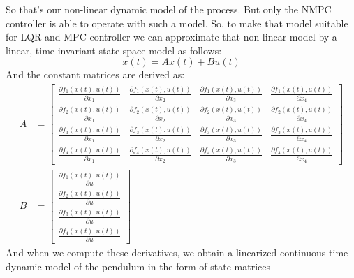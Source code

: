 So that’s our non-linear dynamic model of the process. But only the NMPC controller is able to operate with such a model. So, to make that model suitable for LQR and MPC controller we can approximate that non-linear model by a linear, time-invariant state-space model as follows:
\begin{equation}\dot{x}(t) = Ax(t) + Bu(t)\end{equation}
And the constant matrices are derived as:
\begin{subequations}
	\begin{align}
	A &= \begin{bmatrix}
	\frac{\partial f_1(x(t),u(t))}{\partial x_1}&\frac{\partial f_1(x(t),u(t))}{\partial x_2}&\frac{\partial f_1(x(t),u(t))}{\partial x_3}&\frac{\partial f_1(x(t),u(t))}{\partial x_4}\\
	\frac{\partial f_2(x(t),u(t))}{\partial x_1}&\frac{\partial f_2(x(t),u(t))}{\partial x_2}&\frac{\partial f_2(x(t),u(t))}{\partial x_3}&\frac{\partial f_2(x(t),u(t))}{\partial x_4}\\
	\frac{\partial f_3(x(t),u(t))}{\partial x_1}&\frac{\partial f_3(x(t),u(t))}{\partial x_2}&\frac{\partial f_3(x(t),u(t))}{\partial x_3}&\frac{\partial f_3(x(t),u(t))}{\partial x_4}\\
	\frac{\partial f_4(x(t),u(t))}{\partial x_1}&\frac{\partial f_4(x(t),u(t))}{\partial x_2}&\frac{\partial f_4(x(t),u(t))}{\partial x_3}&\frac{\partial f_4(x(t),u(t))}{\partial x_4}
	\end{bmatrix}\\ 
	B &= \begin{bmatrix}
	\frac{\partial f_1(x(t),u(t))}{\partial u}\\\frac{\partial f_2(x(t),u(t))}{\partial u}\\\frac{\partial f_3(x(t),u(t))}{\partial u}\\\frac{\partial f_4(x(t),u(t))}{\partial u}
	\end{bmatrix}
	\end{align}
\end{subequations}
And when we compute these derivatives, we obtain a linearized continuous-time dynamic model of the pendulum in the form of state matrices
